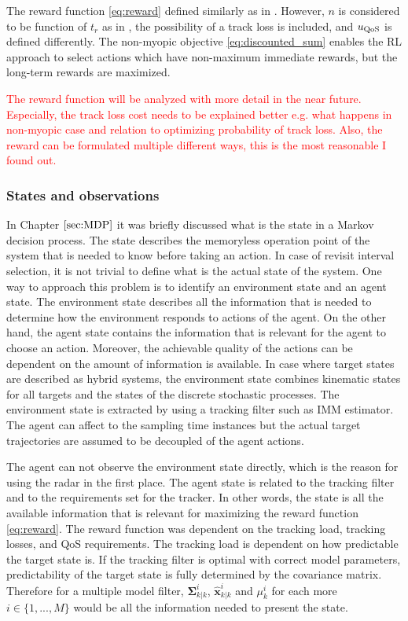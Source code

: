 \documentclass[english, 12pt, a4paper, elec, utf8, a-1b, online]{aaltothesis}
\renewcommand{\vec}[1]{\mathbf{#1}}
\newcommand{\modexpost}{\hat{\vec{x}}^{i}_{k|k}}
\newcommand{\modecovpost}{\bm{\Sigma}^i_{k|k}}
\begin{document}
The reward function \eqref{eq:reward} defined similarly as in \cite{Charlish2015}.
However, $n$ is considered to be function of $t_r$ as in \cite{vanKeuk1993}, the possibility of a track loss is included, and $u_\text{QoS}$ is defined differently.
The non-myopic objective \eqref{eq:discounted_sum} enables the RL approach to select actions which have non-maximum immediate rewards, but the long-term rewards are maximized.

\textcolor{red}{The reward function will be analyzed with more detail in the near future. Especially, the track loss cost needs to be explained better e.g. what happens in non-myopic case and relation to optimizing probability of track loss. Also, the reward can be formulated multiple different ways, this is the most reasonable I found out.}

\subsubsection{States and observations}

In Chapter $\ref{sec:MDP}$ it was briefly discussed what is the state in a Markov decision process.
The state describes the memoryless operation point of the system that is needed to know before taking an action.
In case of revisit interval selection, it is not trivial to define what is the actual state of the system.
One way to approach this problem is to identify an environment state and an agent state.
The environment state describes all the information that is needed to determine how the environment responds to actions of the agent.
On the other hand, the agent state contains the information that is relevant for the agent to choose an action.
Moreover, the achievable quality of the actions can be dependent on the amount of information is available.
In case where target states are described as hybrid systems, the environment state combines kinematic states for all targets and the states of the discrete stochastic processes.
The environment state is extracted by using a tracking filter such as IMM estimator.
The agent can affect to the sampling time instances but the actual target trajectories are assumed to be decoupled of the agent actions.

The agent can not observe the environment state directly, which is the reason for using the radar in the first place.
The agent state is related to the tracking filter and to the requirements set for the tracker.
In other words, the state is all the available information that is relevant for maximizing the reward function \eqref{eq:reward}.
The reward function was dependent on the tracking load, tracking losses, and QoS requirements.
The tracking load is dependent on how predictable the target state is.
If the tracking filter is optimal with correct model parameters, predictability of the target state is fully determined by the covariance matrix.
Therefore for a multiple model filter, $\modecovpost$, $\modexpost$ and $\mu_k^i$ for each more $i \in \{1, ..., M\}$ would be all the information needed to present the state.
\end{document}
